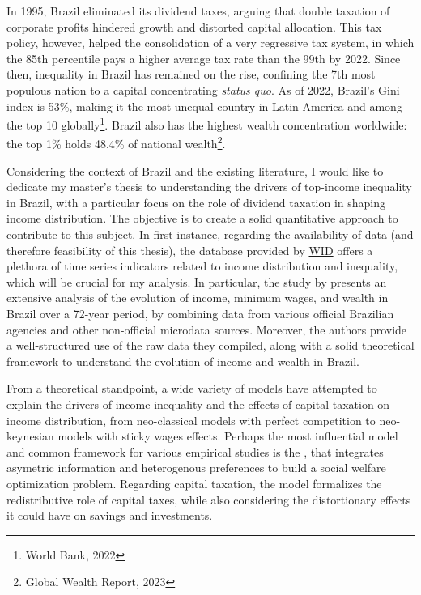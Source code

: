 \documentclass[a4paper, 12pt]{article}
\begin{document}
In 1995, Brazil eliminated its dividend taxes, arguing that double taxation of corporate profits hindered growth and distorted capital allocation.
This tax policy, however, helped the consolidation of a very regressive tax system, in which the 85th percentile pays a higher average tax rate than the 99th by 2022. 
Since then, inequality in Brazil has remained on the rise, confining the 7th most populous nation to a capital concentrating \textit{status quo}. 
As of 2022, Brazil's Gini index is 53\%, making it the most unequal country in Latin America and among the top 10 globally\footnote{World Bank, 2022}.
Brazil also has the highest wealth concentration worldwide: the top 1\% holds 48.4\% of national wealth\footnote{Global Wealth Report, 2023}.
\par
Considering the context of Brazil and the existing literature, I would like to dedicate my master’s thesis to understanding the drivers of top-income inequality in Brazil, with a particular focus on the role of dividend taxation in shaping income distribution.
The objective is to create a solid quantitative approach to contribute to this subject.
In first instance, regarding the availability of data (and therefore feasibility of this thesis), the database provided by \href{https://wid.world/country/brazil/}{WID} offers a plethora of time series indicators related to income distribution and inequality, which will be crucial for my analysis.
In particular, the study by \cite{morgan2025distribution} presents an extensive analysis of the evolution of income, minimum wages, and wealth in Brazil over a 72-year period, by combining data from various official Brazilian agencies and other non-official microdata sources.
Moreover, the authors provide a well-structured use of the raw data they compiled, along with a solid theoretical framework to understand the evolution of income and wealth in Brazil.
\par
From a theoretical standpoint, a wide variety of models have attempted to explain the drivers of income inequality and the effects of capital taxation on income distribution, from neo-classical models with perfect competition to neo-keynesian models with sticky wages effects.
Perhaps the most influential model and common framework for various empirical studies is the \cite{atkinson_design_1976}, that integrates asymetric information and heterogenous preferences to build a social welfare optimization problem.
Regarding capital taxation, the model formalizes the redistributive role of capital taxes, while also considering the distortionary effects it could have on savings and investments.
\end{document}
